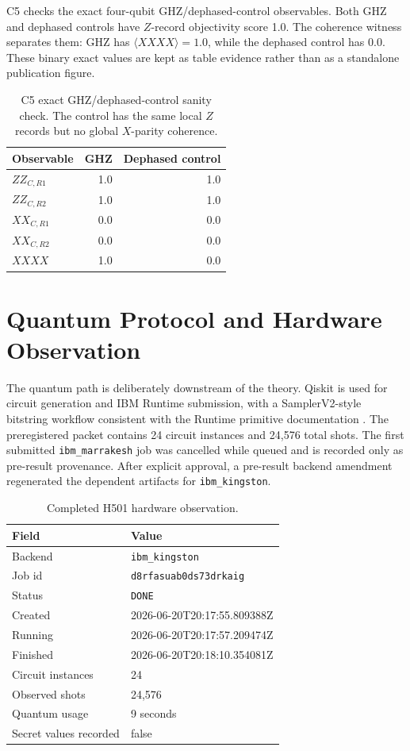\documentclass[11pt]{article}
\begin{document}
C5 checks the exact four-qubit GHZ/dephased-control observables.  Both GHZ and
dephased controls have \(Z\)-record objectivity score 1.0.  The coherence
witness separates them: GHZ has \(\langle XXXX\rangle=1.0\), while the
dephased control has 0.0.  These binary exact values are kept as table evidence
rather than as a standalone publication figure.

\begin{table}[htbp]
\centering
\begin{tabular}{@{}lrr@{}}
\toprule
Observable & GHZ & Dephased control \\
\midrule
\(ZZ_{C,R1}\) & 1.0 & 1.0 \\
\(ZZ_{C,R2}\) & 1.0 & 1.0 \\
\(XX_{C,R1}\) & 0.0 & 0.0 \\
\(XX_{C,R2}\) & 0.0 & 0.0 \\
\(XXXX\) & 1.0 & 0.0 \\
\bottomrule
\end{tabular}
\caption{C5 exact GHZ/dephased-control sanity check.  The control has the same
local \(Z\) records but no global \(X\)-parity coherence.}
\end{table}

\section{Quantum Protocol and Hardware Observation}

The quantum path is deliberately downstream of the theory.  Qiskit is used for
circuit generation and IBM Runtime submission, with a SamplerV2-style bitstring
workflow consistent with the Runtime primitive documentation
\cite{JavadiAbhari2024Qiskit,IBMSamplerV2Docs}.  The preregistered packet
contains 24 circuit instances and 24,576 total shots.  The first submitted
\texttt{ibm\_marrakesh} job was cancelled while queued and is recorded only as
pre-result provenance.  After explicit approval, a pre-result backend amendment
regenerated the dependent artifacts for \texttt{ibm\_kingston}.

\begin{table}[htbp]
\centering
\begin{tabular}{@{}ll@{}}
\toprule
Field & Value \\
\midrule
Backend & \texttt{ibm\_kingston} \\
Job id & \texttt{d8rfasuab0ds73drkaig} \\
Status & \texttt{DONE} \\
Created & 2026-06-20T20:17:55.809388Z \\
Running & 2026-06-20T20:17:57.209474Z \\
Finished & 2026-06-20T20:18:10.354081Z \\
Circuit instances & 24 \\
Observed shots & 24,576 \\
Quantum usage & 9 seconds \\
Secret values recorded & false \\
\bottomrule
\end{tabular}
\caption{Completed H501 hardware observation.}
\end{table}
\end{document}
